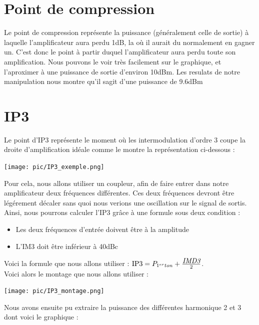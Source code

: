 \documentclass[a4paper,12pt]{report}            %
\begin{document}
\newpage

\section{Point de compression}

Le point de compression représente la puissance (généralement celle de sortie) à laquelle l'amplificateur
aura perdu 1dB, la où il aurait du normalement en gagner un. C'est donc le point à partir duquel l'amplificateur 
aura perdu toute son amplification.
Nous pouvons le voir très facilement sur le graphique, et l'aproximer à une puissance de sortie d'environ 10dBm.
Les resulats de notre manipulation nous montre qu'il sagit d'une puissance de 9.6dBm

\section{IP3}

Le point d'IP3 représente le moment où les intermodulation d'ordre 3 coupe la droite d'amplification idéale comme
le montre la représentation ci-dessous :

\begin{center}\texttt{[image: pic/IP3\_exemple.png]}\\ \end{center}

Pour cela, nous allons utiliser un coupleur, afin de faire entrer dans notre amplificateur deux fréquences différentes.
Ces deux fréquences devront être légérement décaler sans quoi nous verions une oscillation sur le signal de sortis.
Ainsi, nous pourrons calculer l'IP3 grâce à une formule sous deux condition :
\begin{itemize}
    \item Les deux fréquences d'entrée doivent être à la amplitude
    \item L'IM3 doit être inférieur à 40dBc 
\end{itemize}
Voici la formule que nous allons utiliser : $ \mbox{IP3}=P_{1^{er}ton} + \frac{\mbox{\itshape{IMD3}}}{2}$.\\
Voici alors le montage que nous allons utiliser :

\begin{center}\texttt{[image: pic/IP3\_montage.png]}\\ \end{center}

    
Nous avons ensuite pu extraire la puissance des différentes harmonique 2 et 3 dont voici le graphique :
\end{document}
